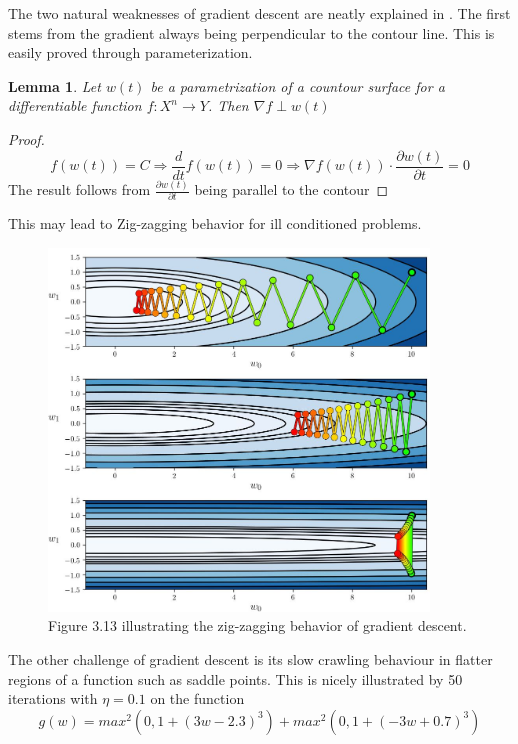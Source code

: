 \documentclass{article}
\newtheorem{lemma}[theorem]{Lemma}
\theoremstyle{definition}
\begin{document}
The two natural weaknesses of gradient descent are neatly explained in \parencite[p.~65--71]{MLRefined}. The first stems from the gradient always being perpendicular to the contour line. This is easily proved through parameterization.


\begin{lemma}
    Let $w(t)$ be a parametrization of a countour surface for a differentiable function $f: X^n \rightarrow Y$. Then $\nabla f \perp w(t) $ 
\end{lemma}

\begin{proof}
$$f(w(t)) = C \Rightarrow \frac{d}{dt} f(w(t)) = 0 \Rightarrow \nabla f(w(t)) \cdot \frac{\partial w(t)}{\partial t} = 0$$
The result follows from $\frac{\partial w(t)}{\partial t}$ being parallel to the contour
\end{proof}

This may lead to Zig-zagging behavior for ill conditioned problems.

\begin{figure}[H]
    \centering
    \includegraphics[width=0.9\textwidth]{Project2/figures/Gradient_descent_zigzag.jpeg}
    \caption{Figure 3.13 \parencite[p.~68]{MLRefined} illustrating the zig-zagging behavior
of gradient descent.}
    \label{fig:zigzagGradientDescent}
\end{figure}

The other challenge of gradient descent is its slow crawling behaviour in flatter regions of a function such as saddle points.  
This is nicely illustrated by 50 iterations with $\eta = 0.1$ on the function 
\[g(w) =  max^2(0, 1 + (3w - 2.3)^3) + max^2(0, 1 + (-3w + 0.7)^3)\]
\end{document}
